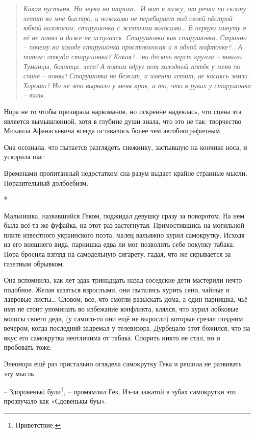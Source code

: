 \documentclass[
  a5paperpaper,
  DIV=11,
  numbers=noendperiod]{scrreprt}
\begin{document}
\begin{quote}
\emph{Какая пустыня. Ни звука ни шороха\ldots{} И вот я вижу, от речки
по склону летит ко мне быстро, и ножками не перебирает под своей пёстрой
юбкой колоколом, старушонка с желтыми волосами\ldots{} В первую минуту я
её не понял и даже не испугался. Старушонка как старушонка. Странно --
почему на холоде старушонка простоволосая и в одной кофточке?.. А потом:
откуда старушонка? Какая?.. на десять верст кругом -- никого. Туманцы,
болотца, леса! А потом вдруг пот холодный потёк у меня по спине --
понял! Старушонка не бежит, а именно летит, не касаясь земли. Хорошо? Но
не это вырвало у меня крик, а то, что в руках у старушонка -- вилы.}
\end{quote}

Нора не то чтобы призирала наркоманов, но искренне надеялась, что сцена
эта является вымышленной, хотя в глубине души знала, что это не так:
творчество Михаила Афанасьевича всегда оставалось более чем
автобиографичным.

Она осознала, что пытается разглядеть снежинку, застывшую на кончике
носа, и ускорила шаг.

Временами пропитанный недостатком сна разум выдает крайне странные
мысли. Поразительный долбоебизм.

*

Мальчишка, назвавшийся Геком, поджидал девушку сразу за поворотом. На
нем была всё та же фуфайка, на этот раз застегнутая. Примостившись на
могильной плите известного украинского поэта, малец вальяжно курил
самокрутку. Исходя из его внешнего вида, парнишка едва ли мог позволить
себе покупку табака. Нора бросила взгляд на самодельную сигарету, гадая,
что же скрывается за газетным обрывком.

Она вспомнила, как лет эдак тринадцать назад соседские дети мастерили
нечто подобное. Желая казаться взрослыми, они пытались курить сено,
чайные и лавровые листы\ldots{} Словом, все, что смогли разыскать дома,
а один парнишка, чьё имя не стоит упоминать во избежание конфликта,
клялся, что курил лобковые волосы своего деда, (у самого-то они ещё не
выросли) которые срезал поздним вечером, когда последний задремал у
телевизора. Дурбецало этот божился, что на вкус его самокрутка
неотличима от табака. Спорить никто не стал, но и пробовать тоже.

Элеонора ещё раз пристально оглядела самокрутку Гека и решила не
развивать эту мысль.

-- Здоровенькі були\footnote{Приветствие.}, -- промямлил Гек. Из-за
зажатой в зубах самокрутки это прозвучало как «Сдовенькы буы».
\end{document}
